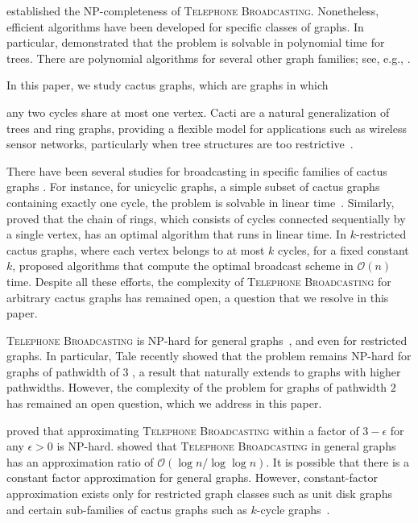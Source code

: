 \documentclass[letterpaper,11pt]{article}
\newcommand{\oh}{\mathcal{O}}
\newcommand{\telebr}{\textsc{Telephone Broadcasting}\xspace}
\begin{document}
\citet{slater1981nptree} established the NP-completeness of \telebr. 
Nonetheless, efficient algorithms have been developed for specific classes of graphs. 
In particular, \citet{fraigniaud2002polynomial} demonstrated that the problem is solvable in polynomial time for trees. There are polynomial
algorithms for several other graph families; see, e.g., \cite{damaschke2024starclique, gholami2023fullytree, Liestman1988Boundeddegree, stohr1991butterfly}.


In this paper, we study cactus graphs, which are graphs in which

any two cycles share at most one vertex. 
Cacti are a natural generalization of trees and ring graphs, providing a flexible model for applications such as wireless sensor networks, particularly when tree structures are too restrictive~\cite{ben2012centdian}.
 
There have been several studies for broadcasting in specific families of cactus graphs \cite{vcevnik2017broadcasting, ehresmann2021approximation, harutyunyan2009necklace, Harutyunyan2007unicyclic, harutyunyan2008unicyclic, harutyunyan2023chainring}. For instance, for unicyclic graphs, a simple subset of cactus graphs containing exactly one cycle, the problem is solvable in linear time~\cite{Harutyunyan2007unicyclic}.
Similarly, \cite{harutyunyan2023chainring} proved that the chain of rings, which consists of cycles connected sequentially by a single vertex, has an optimal algorithm that runs in linear time. 
In $k$-restricted cactus graphs, where each vertex belongs to at most $k$ cycles, for a fixed constant $k$, \citet{vcevnik2017broadcasting} proposed algorithms that compute the optimal broadcast scheme 
in $\oh(n)$ time. Despite all these efforts, the complexity of \telebr for arbitrary cactus graphs has remained open, a question that we resolve in this paper. 

\telebr is NP-hard for general graphs~\cite{GareyJ79}, and even for restricted graphs. In particular, Tale recently showed that the problem remains NP-hard for graphs of pathwidth of $3$ \cite{tale2024double}, a result that naturally extends to graphs with higher pathwidths. However, the complexity of the problem for graphs of pathwidth $2$ has remained an open question, which we address in this paper.

\citet{elkin2002lowerbound} proved that approximating \telebr within a factor of $3 - \epsilon$ for any $\epsilon > 0$ is NP-hard. \citet{kortsarz1995approximation} showed that \telebr in general graphs has an approximation ratio of $\oh(\log n / \log \log n)$. 
It is possible that there is a constant factor approximation for general graphs. However, 
constant-factor approximation exists only for restricted graph classes such as unit disk graphs~\cite{shang2010unitdisk} and certain sub-families of cactus graphs such as $k$-cycle graphs~\cite{BhabakH15}.
\end{document}
